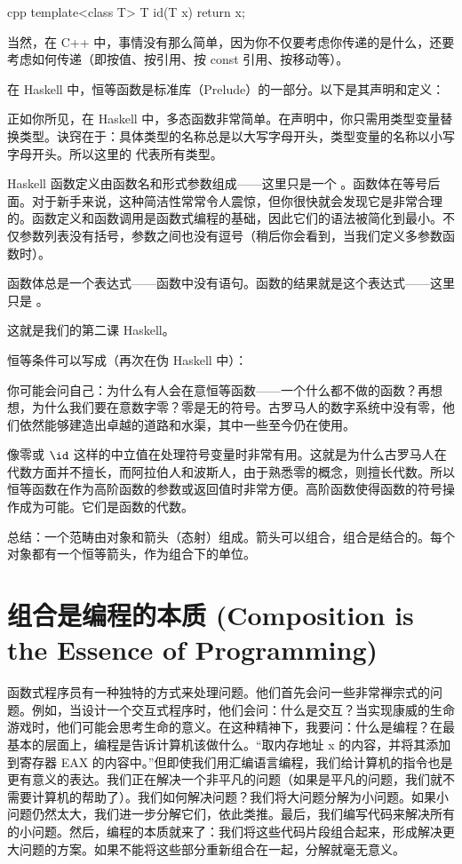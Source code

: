 \begin{snip}{cpp}
  template<class T> T id(T x) { return x; }
\end{snip}
当然，在 C++ 中，事情没有那么简单，因为你不仅要考虑你传递的是什么，还要考虑如何传递（即按值、按引用、按 const 引用、按移动等）。

在 Haskell 中，恒等函数是标准库（Prelude）的一部分。以下是其声明和定义：

正如你所见，在 Haskell 中，多态函数非常简单。在声明中，你只需用类型变量替换类型。诀窍在于：具体类型的名称总是以大写字母开头，类型变量的名称以小写字母开头。所以这里的  代表所有类型。

Haskell 函数定义由函数名和形式参数组成——这里只是一个 。函数体在等号后面。对于新手来说，这种简洁性常常令人震惊，但你很快就会发现它是非常合理的。函数定义和函数调用是函数式编程的基础，因此它们的语法被简化到最小。不仅参数列表没有括号，参数之间也没有逗号（稍后你会看到，当我们定义多参数函数时）。

函数体总是一个表达式——函数中没有语句。函数的结果就是这个表达式——这里只是 。

这就是我们的第二课 Haskell。

恒等条件可以写成（再次在伪 Haskell 中）：

你可能会问自己：为什么有人会在意恒等函数——一个什么都不做的函数？再想想，为什么我们要在意数字零？零是无的符号。古罗马人的数字系统中没有零，他们依然能够建造出卓越的道路和水渠，其中一些至今仍在使用。

像零或 $\id$ 这样的中立值在处理符号变量时非常有用。这就是为什么古罗马人在代数方面并不擅长，而阿拉伯人和波斯人，由于熟悉零的概念，则擅长代数。所以恒等函数在作为高阶函数的参数或返回值时非常方便。高阶函数使得函数的符号操作成为可能。它们是函数的代数。

总结：一个范畴由对象和箭头（态射）组成。箭头可以组合，组合是结合的。每个对象都有一个恒等箭头，作为组合下的单位。

\section{组合是编程的本质 (Composition is the Essence of Programming)}

函数式程序员有一种独特的方式来处理问题。他们首先会问一些非常禅宗式的问题。例如，当设计一个交互式程序时，他们会问：什么是交互？当实现康威的生命游戏时，他们可能会思考生命的意义。在这种精神下，我要问：什么是编程？在最基本的层面上，编程是告诉计算机该做什么。“取内存地址 x 的内容，并将其添加到寄存器 EAX 的内容中。”但即使我们用汇编语言编程，我们给计算机的指令也是更有意义的表达。我们正在解决一个非平凡的问题（如果是平凡的问题，我们就不需要计算机的帮助了）。我们如何解决问题？我们将大问题分解为小问题。如果小问题仍然太大，我们进一步分解它们，依此类推。最后，我们编写代码来解决所有的小问题。然后，编程的本质就来了：我们将这些代码片段组合起来，形成解决更大问题的方案。如果不能将这些部分重新组合在一起，分解就毫无意义。

